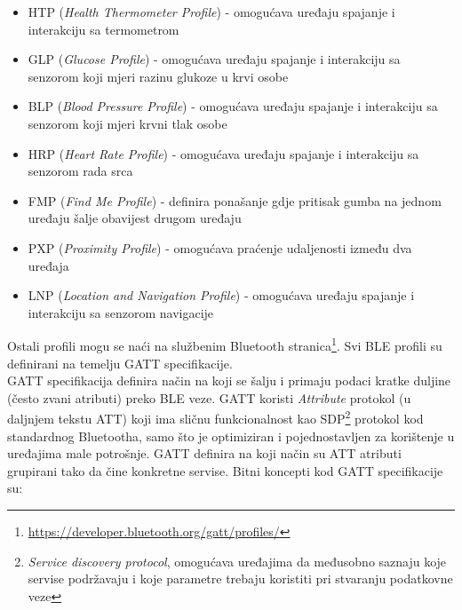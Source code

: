 \begin{itemize}
    \item HTP (\textit{Health Thermometer Profile}) - omogućava uređaju spajanje i interakciju sa termometrom
    \item GLP (\textit{Glucose Profile}) - omogućava uređaju spajanje i interakciju sa senzorom koji mjeri razinu glukoze u krvi osobe
    \item BLP (\textit{Blood Pressure Profile}) - omogućava uređaju spajanje i interakciju sa senzorom koji mjeri krvni tlak osobe
    \item HRP (\textit{Heart Rate Profile}) - omogućava uređaju spajanje i interakciju sa senzorom rada srca 
    \item FMP (\textit{Find Me Profile}) - definira ponašanje gdje pritisak gumba na jednom uređaju šalje obavijest drugom uređaju
    \item PXP (\textit{Proximity Profile}) - omogućava praćenje udaljenosti između dva uređaja
    \item LNP (\textit{Location and Navigation Profile}) - omogućava uređaju spajanje i interakciju sa senzorom navigacije
\end{itemize}
Ostali profili mogu se naći na službenim Bluetooth stranica\footnote{\url{https://developer.bluetooth.org/gatt/profiles/}}. Svi BLE profili su definirani na temelju GATT specifikacije.
\\

GATT specifikacija definira način na koji se šalju i primaju podaci kratke duljine (često zvani atributi) preko BLE veze. 
GATT koristi \textit{Attribute} protokol (u daljnjem tekstu ATT) koji ima sličnu funkcionalnost kao SDP\footnote{\textit{Service discovery protocol}, omogućava uređajima da međusobno saznaju koje servise podržavaju i koje parametre trebaju koristiti pri stvaranju podatkovne veze} protokol kod standardnog Bluetootha, samo što je optimiziran i pojednostavljen za korištenje u uređajima male potrošnje. 
GATT definira na koji način su ATT atributi grupirani tako da čine konkretne servise. 
Bitni koncepti kod GATT specifikacije su:


